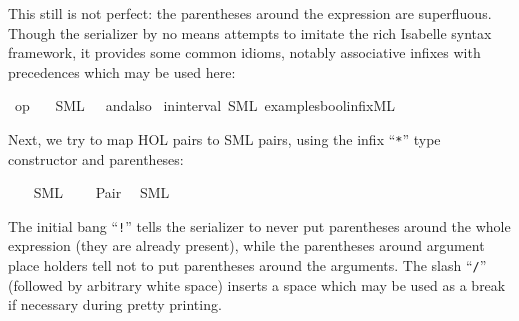 \begin{isabellebody}
\begin{isamarkuptext}
  This still is not perfect: the parentheses
  around the  expression are superfluous.
  Though the serializer
  by no means attempts to imitate the rich Isabelle syntax
  framework, it provides some common idioms, notably
  associative infixes with precedences which may be used here:%
\end{isamarkuptext}%
\isamarkuptrue%
%
\isadelimtt
%
\endisadelimtt
%
\isatagtt
{}\isamarkupfalse%
\ {\isachardoublequoteopen}op\ {\isasymand}{\isachardoublequoteclose}\isanewline
\ \ {\isacharparenleft}SML\ \ {}\ {\isachardoublequoteopen}andalso{\isachardoublequoteclose}{\isacharparenright}%
\endisatagtt
{\isafoldtt}%
%
\isadelimtt
%
\endisadelimtt
\isanewline
\isanewline
{}\isamarkupfalse%
\ in{\isacharunderscore}interval\ {\isacharparenleft}SML\ {\isachardoublequoteopen}examples{\isacharslash}bool{\isacharunderscore}infix{\isachardot}ML{\isachardoublequoteclose}{\isacharparenright}%
\begin{isamarkuptext}%

  Next, we try to map HOL pairs to SML pairs, using the
  infix ``\verb|*|'' type constructor and parentheses:%
\end{isamarkuptext}%
\isamarkuptrue%
\isanewline
%
\isadelimtt
%
\endisadelimtt
%
\isatagtt
{}\isamarkupfalse%
\ {\isacharasterisk}\isanewline
\ \ {\isacharparenleft}SML\ \ {}\ {\isachardoublequoteopen}{\isacharasterisk}{\isachardoublequoteclose}{\isacharparenright}\isanewline
\isanewline
{}\isamarkupfalse%
\ Pair\isanewline
\ \ {\isacharparenleft}SML\ {\isachardoublequoteopen}{\isacharbang}{\isacharparenleft}{\isacharparenleft}{\isacharunderscore}{\isacharparenright}{\isacharcomma}{\isacharslash}\ {\isacharparenleft}{\isacharunderscore}{\isacharparenright}{\isacharparenright}{\isachardoublequoteclose}{\isacharparenright}%
\endisatagtt
{\isafoldtt}%
%
\isadelimtt
%
\endisadelimtt
%
\begin{isamarkuptext}%
The initial bang ``\verb|!|'' tells the serializer to never put
  parentheses around the whole expression (they are already present),
  while the parentheses around argument place holders
  tell not to put parentheses around the arguments.
  The slash ``\verb|/|'' (followed by arbitrary white space)
  inserts a space which may be used as a break if necessary
  during pretty printing.


\end{isamarkuptext}
\end{isabellebody}
